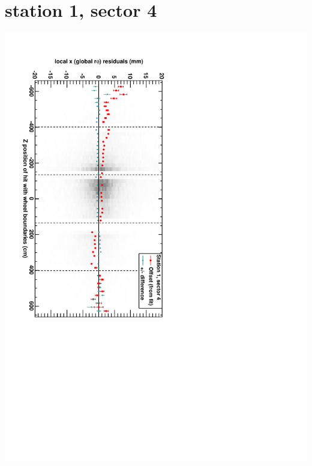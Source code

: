 \documentclass[compress]{beamer}
\begin{document}
\section*{station 1, sector 4}
\begin{frame} \vfill \mbox{\hspace{-1 cm}\includegraphics[height=1.2\linewidth, angle=90]{DTrphiVsZ_st1_sr04.pdf}} \end{frame}
\end{document}
